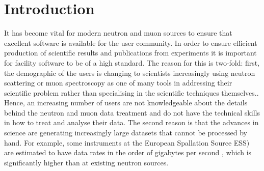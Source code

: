 \documentclass[jnr]{iosart2x}
\begin{document}
\begin{frontmatter}
\begin{keyword}
\end{keyword}

\end{frontmatter}

\newpage

\section{Introduction}
\label{Introduction}

It has become vital for modern neutron and muon sources to ensure that excellent software is available for the user community.
In order to ensure efficient production of scientific results and publications from experiments it is important for facility software to be of a high standard.
The reason for this is two-fold: first, the demographic of the users is changing to scientists increasingly using neutron scattering or muon spectroscopy as one of many tools in addressing their scientific problem rather than specialising in the scientific techniques themselves..
Hence, an increasing number of users are not knowledgeable about the details behind the neutron and muon data treatment and  do not have the technical skills in how to treat and analyse their data.
The second reason is that the advances in science are generating increasingly large datasets that cannot be processed by hand.
For example, some instruments at the European Spallation Source ESS) are estimated to have data rates in the order of gigabytes per second \cite{Christensen_2018}, which is significantly higher than at existing neutron sources.
\end{document}
